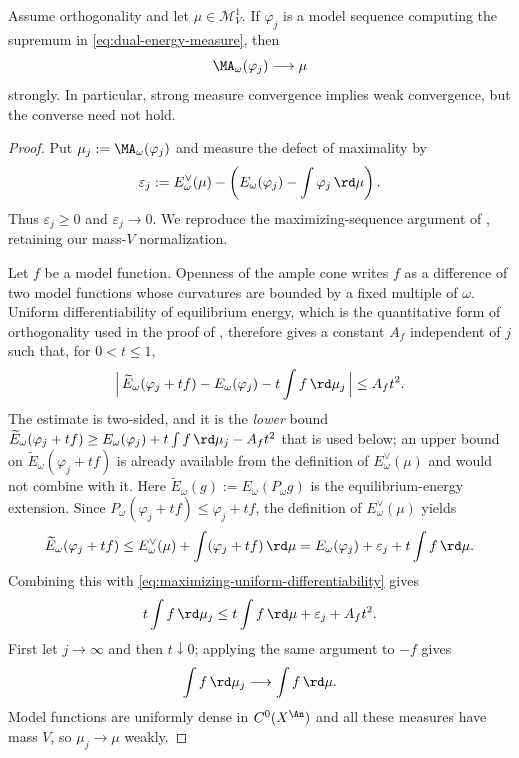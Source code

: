 \begin{theorem}
\label{thm:finite-energy-measure-stability}
Assume orthogonality and let $\mu\in\mathcal M^1_V$.  If
$\varphi_j$ is a model sequence computing the supremum in
\eqref{eq:dual-energy-measure}, then
\[
                     \MA_\omega(\varphi_j)\longrightarrow\mu
\]
strongly.  In particular, strong measure convergence implies weak
convergence, but the converse need not hold.
\end{theorem}
\begin{proof}
Put $\mu_j:=\MA_\omega(\varphi_j)$ and measure the defect of maximality by
\[
 \varepsilon_j:=E_\omega^\vee(\mu)-
 \left(E_\omega(\varphi_j)-\int\varphi_j\,\rd\mu\right).
\]
Thus $\varepsilon_j\geq0$ and $\varepsilon_j\to0$.  We reproduce the
maximizing-sequence argument of
\cite[Theorem~2.23]{BJ25FiniteEnergy}, retaining our mass-$V$
normalization.

Let $f$ be a model function.  Openness of the ample cone writes $f$ as a
difference of two model functions whose curvatures are bounded by a fixed
multiple of $\omega$.  Uniform differentiability of equilibrium energy,
which is the quantitative form of orthogonality used in the proof of
, therefore gives a constant
$A_f$ independent of $j$ such that, for $0<t\leq1$,
\begin{equation}\label{eq:maximizing-uniform-differentiability}
 \Bigl|\,\widetilde E_\omega(\varphi_j+tf)-E_\omega(\varphi_j)
   -t\int f\,\rd\mu_j\,\Bigr|
 \leq A_f t^2.
\end{equation}
The estimate is two-sided, and it is the \emph{lower} bound
$\widetilde E_\omega(\varphi_j+tf)\geq
  E_\omega(\varphi_j)+t\int f\,\rd\mu_j-A_ft^2$
that is used below; an upper bound on
$\widetilde E_\omega(\varphi_j+tf)$ is already available from the
definition of $E^\vee_\omega(\mu)$ and would not combine with it.
Here
$\widetilde E_\omega(g):=E_\omega(P_\omega g)$ is the equilibrium-energy
extension.  Since $P_\omega(\varphi_j+tf)\leq\varphi_j+tf$, the definition
of $E_\omega^\vee(\mu)$ yields
\[
 \widetilde E_\omega(\varphi_j+tf)
 \leq E_\omega^\vee(\mu)+
      \int(\varphi_j+tf)\,\rd\mu
 =E_\omega(\varphi_j)+\varepsilon_j+
      t\int f\,\rd\mu.
\]
Combining this with
\eqref{eq:maximizing-uniform-differentiability} gives
\[
 t\int f\,\rd\mu_j
 \leq t\int f\,\rd\mu+\varepsilon_j+A_ft^2.
\]
First let $j\to\infty$ and then $t\downarrow0$; applying the same argument
to $-f$ gives
\[
                     \int f\,\rd\mu_j\longrightarrow
                     \int f\,\rd\mu.
\]
Model functions are uniformly dense in $C^0(X^{\An})$ and all these
measures have mass $V$, so $\mu_j\to\mu$ weakly.


\end{proof}

